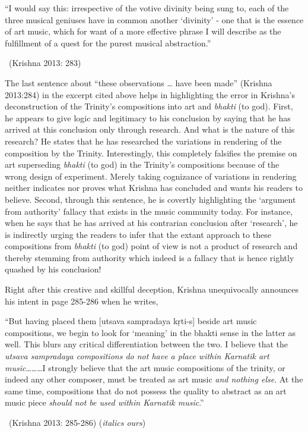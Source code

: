 \begin{myquote}
“I would say this: irrespective of the votive divinity being sung to, each of the three musical geniuses have in common another ‘divinity’ - one that is the essence of art music, which for want of a more effective phrase I will describe as the fulfillment of a quest for the purest musical abstraction.” 

~\hfill (Krishna 2013: 283)
\end{myquote}

The last sentence about “these observations … have been made” (Krishna 2013:284) in the excerpt cited above helps in highlighting the error in Krishna’s deconstruction of the Trinity’s compositions into art and \textit{bhakti} (to god). First, he appears to give logic and legitimacy to his conclusion by saying that he has arrived at this conclusion only through research. And what is the nature of this research? He states that he has researched the variations in rendering of the composition by the Trinity. Interestingly, this completely falsifies the premise on art superseding \textit{bhakti} (to god) in the Trinity’s compositions because of the wrong design of experiment. Merely taking cognizance of variations in rendering neither indicates nor proves what Krishna has concluded and wants his readers to believe. Second, through this sentence, he is covertly highlighting the ‘argument from authority’ fallacy that exists in the music community today. For instance, when he says that he has arrived at his contrarian conclusion after ‘research’, he is indirectly urging the readers to infer that the extant approach to these compositions from \textit{bhakti} (to god) point of view is not a product of research and thereby stemming from authority which indeed is a fallacy that is hence rightly quashed by his conclusion!

Right after this creative and skillful deception, Krishna unequivocally announces his intent in page 285-286 when he writes,

\begin{myquote}
“But having placed them [utsava sampradaya kṛti-s] beside art music compositions, we begin to look for ‘meaning’ in the bhakti sense in the latter as well. This blurs any critical differentiation between the two. I believe that the \textit{utsava sampradaya compositions do not have a place within Karnatik art music}………I strongly believe that the art music compositions of the trinity, or indeed any other composer, must be treated as art music \textit{and nothing else}. At the same time, compositions that do not possess the quality to abstract as an art music piece \textit{should not be used within Karnatik music}.” 

~\hfill (Krishna 2013: 285-286) (\textit{italics ours})
\end{myquote}

